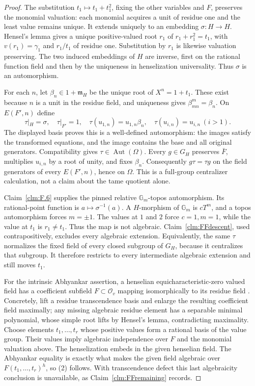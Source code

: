 \documentclass[11pt]{article}
\begin{document}
\begin{proof}
The substitution \(t_1\mapsto t_1+t_1^2\), fixing the
other variables and \(F\), preserves the monomial
valuation: each monomial acquires a unit of residue one
and the least value remains unique. It extends uniquely
to an embedding \(\sigma:H\to H\). Hensel's lemma
gives a unique positive-valued root \(r_1\) of
\(r_1+r_1^2=t_1\), with \(v(r_1)=\gamma_1\) and
\(r_1/t_1\) of residue one. Substitution by \(r_1\)
is likewise valuation preserving. The two induced
embeddings of \(H\) are inverse, first on the rational
function field and then by the uniqueness in henselization
universality. Thus \(\sigma\) is an automorphism.

For each \(n\), let \(\beta_n\in1+\mathfrak m_H\)
be the unique root of \(X^n=1+t_1\). These exist because
\(n\) is a unit in the residue field, and uniqueness
gives \(\beta_{mn}^{m}=\beta_n\). On \(E(F',n)\)
define
\[
 \tau|_H=\sigma,\quad \tau|_{F'}=1,\quad
 \tau(u_{1,n})=u_{1,n}\beta_n,\quad
 \tau(u_{i,n})=u_{i,n}\ (i>1).
\]
The displayed basis proves this is a well-defined
automorphism: the images satisfy the transformed equations,
and the image contains the base and all original generators.
Compatibility gives \(\tau\in\operatorname{Aut}(\Omega)\).
Every \(g\in G_H\) preserves \(\bar F\), multiplies
\(u_{i,n}\) by a root of unity, and fixes \(\beta_n\).
Consequently \(g\tau=\tau g\) on the field generators
of every \(E(F',n)\), hence on \(\Omega\). This is a
full-group centralizer calculation, not a claim about
the tame quotient alone.

Claim~\ref{clm:F.6} supplies the pinned relative
\(\mathbb G_m\)-topos automorphism. Its rational-point
function is \(a\mapsto\sigma^{-1}(a)\). A
\(H\)-morphism of \(\mathbb G_m\) is \(cT^m\),
and a topos automorphism forces \(m=\pm1\). The values
at \(1\) and \(2\) force \(c=1,m=1\), while the
value at \(t_1\) is \(r_1\ne t_1\). Thus the map
is not algebraic. Claim~\ref{clm:FFdescent}, used
contrapositively, excludes every algebraic extension.
Equivalently, the same \(\tau\) normalizes the fixed field
of every closed subgroup of \(G_H\), because it centralizes
that subgroup. It therefore restricts to every intermediate
algebraic extension and still moves \(t_1\).

For the intrinsic Abhyankar assertion, a henselian
equicharacteristic-zero valued field has a coefficient
subfield \(F\subset\mathcal O_v\) mapping isomorphically
to its residue field \citep[Proposition~3.3.8]{FF_ADH2017}.
Concretely, lift a residue transcendence basis and enlarge
the resulting coefficient field maximally; any missing
algebraic residue element has a separable minimal polynomial,
whose simple root lifts by Hensel's lemma, contradicting
maximality. Choose elements \(t_1,\ldots,t_r\) whose
positive values form a rational basis of the value group.
Their values imply algebraic independence over \(F\)
and the monomial valuation above. The henselization
embeds in the given henselian field. The Abhyankar equality
is exactly what makes the given field algebraic over
\(F(t_1,\ldots,t_r)^h\), so (2) follows. With
transcendence defect this last algebraicity conclusion
is unavailable, as Claim~\ref{clm:FFremaining} records.


\end{proof}
\end{document}
